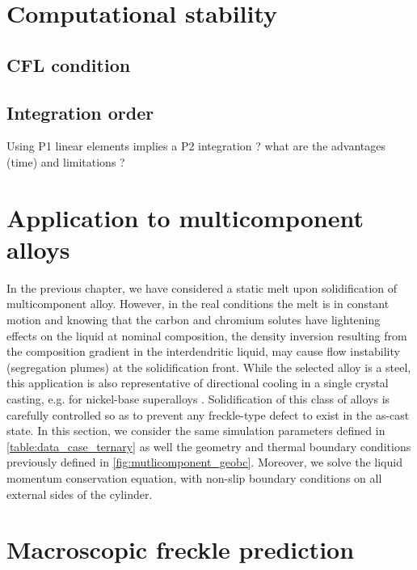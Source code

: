 \section{Computational stability}
\subsection{CFL condition}
\subsection{Integration order}
Using P1 linear elements implies a P2 integration ? what are the advantages (time) and limitations ?




\section{Application to multicomponent alloys}

In the previous chapter, we have considered a static melt upon solidification of multicomponent alloy. However, in the real conditions the melt is in constant motion 
and knowing that the carbon and chromium solutes have lightening effects on the liquid 
at nominal composition, the density inversion resulting from the composition gradient in the interdendritic 
liquid, may cause flow instability (segregation plumes) at the solidification front. While the selected alloy 
is a steel, this application is also representative of directional cooling in a single crystal casting, e.g. 
for nickel-base superalloys \citep{beckermann_development_2000}. Solidification of this class of alloys is carefully
controlled so as to prevent any freckle-type defect to exist in the as-cast state.
In this section, we consider the same simulation parameters defined in \cref{table:data_case_ternary} as well the geometry and thermal boundary conditions
previously defined in \cref{fig:mutlicomponent_geobc}. Moreover, we solve the liquid momentum conservation equation, with non-slip boundary conditions
on all external sides of the cylinder.

\section{Macroscopic freckle prediction}
